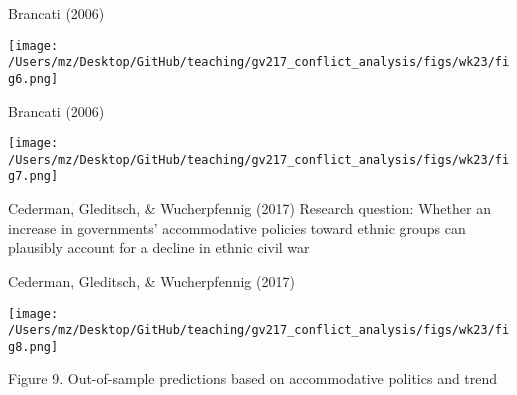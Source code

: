\documentclass[handout]{beamer}
\begin{document}
\begin{frame}{Brancati (2006)}
    \pause
    \begin{center}
        \texttt{[image: /Users/mz/Desktop/GitHub/teaching/gv217\_conflict\_analysis/figs/wk23/fig6.png]}
    \end{center}
\end{frame}

\begin{frame}{Brancati (2006)}
    \pause
    \begin{center}
        \texttt{[image: /Users/mz/Desktop/GitHub/teaching/gv217\_conflict\_analysis/figs/wk23/fig7.png]}
    \end{center}
\end{frame}

\begin{frame}{Cederman, Gleditsch, \& Wucherpfennig (2017)}
    \pause Research question: \pause Whether an increase in governments' accommodative policies toward ethnic groups can plausibly account for a decline in ethnic civil war
\end{frame}

\begin{frame}{Cederman, Gleditsch, \& Wucherpfennig (2017)}
    \pause
    \begin{center}
        \texttt{[image: /Users/mz/Desktop/GitHub/teaching/gv217\_conflict\_analysis/figs/wk23/fig8.png]}
    \end{center}
    \tiny Figure 9. Out-of-sample predictions based on accommodative politics and trend
\end{frame}
\end{document}
